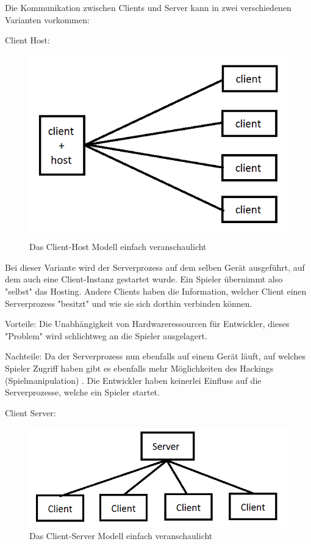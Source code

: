 Die Kommunikation zwischen Clients und Server kann in zwei verschiedenen Varianten vorkommen:

\textsf{\Large Client Host:}

\begin{figure}
	\centering
	\includegraphics{images/Client_Host.png}
	\caption[Client-Server Modell]{Das Client-Host Modell einfach veranschaulicht}
	\label{pic:Client_Host}
\end{figure}




Bei dieser Variante wird der Serverprozess auf dem selben Gerät ausgeführt, auf dem auch eine Client-Instanz gestartet wurde. Ein Spieler übernimmt also "selbst" das Hosting. Andere Clients haben die Information, welcher Client einen Serverprozess "besitzt" und wie sie sich dorthin verbinden können. 

Vorteile: Die Unabhängigkeit von Hardwareressourcen für Entwickler, dieses "Problem" wird schlichtweg an die Spieler ausgelagert. 

Nachteile: Da der Serverprozess nun ebenfalls auf einem Gerät läuft, auf welches Spieler Zugriff haben gibt es ebenfalls mehr Möglichkeiten des Hackings (Spielmanipulation) \cite{Wikipedia.2021h}. Die Entwickler haben keinerlei Einfluss auf die Serverprozesse, welche ein Spieler startet.
\cite{Smed.2002}

\textsf{\Large Client Server:}

\begin{figure}
\centering
\includegraphics{images/Client_Server.png}
\caption[Client-Server Modell]{Das Client-Server Modell einfach veranschaulicht}
\label{pic:Client_Server}
\end{figure}



